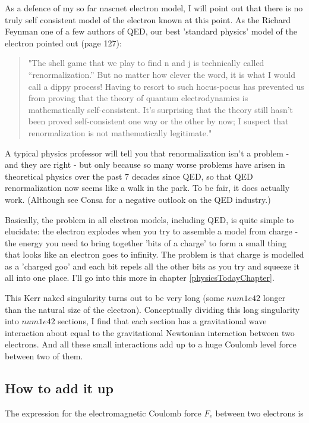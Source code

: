 \documentclass[../rzero]{subfiles}
\begin{document}
As a defence of my so far nascnet electron model, I will point out that there is no truly self consistent model of the electron known at this point. As the Richard Feynman one of a few authors of QED, our best 'standard physics' model of the electron pointed out\cite{Feynman1985} (page 127): 

\begin{quotation}
"The shell game that we play to find n and j is technically called “renormalization.” But no matter how clever the word, it is what I would call a dippy process! Having to resort to such hocus-pocus has prevented us from proving that the theory of quantum electrodynamics is mathematically self-consistent. It’s surprising that the theory still hasn’t been proved self-consistent one way or the other by now; I suspect that renormalization is not mathematically legitimate." 
\end{quotation}

A typical physics professor will tell you that renormalization isn't a problem - and they are right - but only because so many worse problems have arisen in theoretical physics over the past 7 decades since QED, so that QED renormalization now seems like a walk in the park. To be fair, it does actually work. (Although see Consa\cite{Cioletti2006} for a negative outlook on the QED industry.)

Basically, the problem in all electron models, including QED, is quite simple to elucidate: the electron explodes when you try to assemble a model from charge - the energy you need to bring together 'bits of a charge' to form a small thing that looks like an electron goes to infinity. The problem is that charge is modelled as a 'charged goo' and each bit repels all the other bits as you try and squeeze it all into one place. I'll go into this more in chapter \ref{physicsTodayChapter}.  

This Kerr naked singularity turns out to be very long (some $num{1e42}$ longer than the natural size of the electron). Conceptually dividing this long singularity into  $num{1e42}$ sections, I find that each section has a gravitational wave interaction about equal to the gravitational Newtonian interaction between two electrons. And all these small interactions add up to a huge Coulomb level force between two of them.  

\subsection{How to add it up}
The expression for the electromagnetic Coulomb force $F_e$ between two electrons is 
\end{document}
